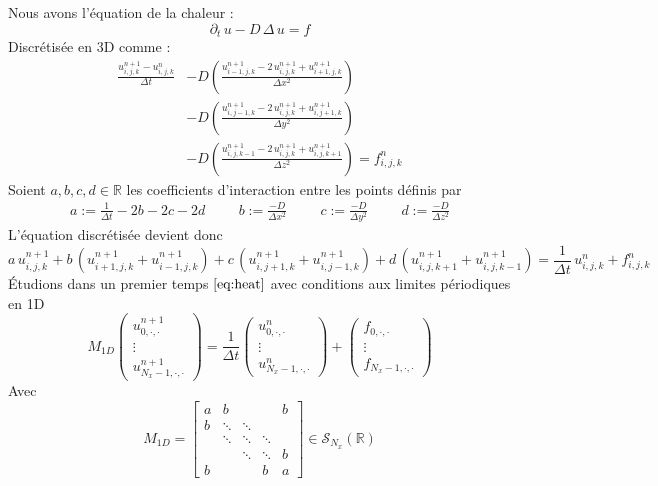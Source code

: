 \documentclass[11pt,a4paper]{article}
\begin{document}
Nous avons l'équation de la chaleur :
\begin{equation}
\partial_t\,u - D\,\Delta\,u = f\label{eq:heat}
\end{equation}
Discrétisée en 3D comme :
\begin{align*}
\frac{u^{n+1}_{i,j,k} - u^n_{i,j,k}}{\Delta t} &- D \left(\frac{u^{n+1}_{i-1,j,k} - 2\,u^{n+1}_{i,j,k}+u^{n+1}_{i+1,j,k}}{\Delta x^2} \right)\\
&-D \left(\frac{u^{n+1}_{i,j-1,k} - 2\,u^{n+1}_{i,j,k}+u^{n+1}_{i,j+1,k}}{\Delta y^2}\right)\\
&-D \left(\frac{u^{n+1}_{i,j,k-1} - 2\,u^{n+1}_{i,j,k}+u^{n+1}_{i,j,k+1}}{\Delta z^2}\right)= f_{i,j,k}^{n}
\end{align*}
Soient $a, b, c, d\in\mathbb{R}$ les coefficients d'interaction entre les points définis par
\begin{align*}
a := \frac{1}{\Delta t} -2b-2c-2d\hspace{1cm}b :=\frac{-D}{\Delta x^2}\hspace{1cm}c :=\frac{-D}{\Delta y^2}\hspace{1cm}d :=\frac{-D}{\Delta z^2}
\end{align*}
L'équation discrétisée devient donc
\begin{equation*}
a\,u_{i,j,k}^{n+1} + b\,\left(u_{i+1, j, k}^{n+1}+u_{i-1, j, k}^{n+1}\right) + c\,\left(u_{i, j+1, k}^{n+1}+u_{i, j-1, k}^{n+1}\right) + d\,\left(u_{i, j, k+1}^{n+1}+u_{i, j, k-1}^{n+1}\right) = \frac{1}{\Delta t}\,u_{i, j, k}^{n} + f_{i, j, k}^{n}
\end{equation*}
Étudions dans un premier temps $\eqref{eq:heat}$ avec conditions aux limites périodiques en 1D
\begin{equation*}
M_{1D}\left(\begin{array}{c}
u_{0, \cdot, \cdot}^{n+1}\\
\vdots\\
u_{N_x-1, \cdot, \cdot}^{n+1}
\end{array}\right) = \frac{1}{\Delta t} \left(\begin{array}{c}
u_{0, \cdot, \cdot}^{n}\\
\vdots\\
u_{N_x-1, \cdot, \cdot}^{n}
\end{array}\right) + \left(\begin{array}{c}
f_{0, \cdot, \cdot}\\
\vdots\\
f_{N_x-1, \cdot, \cdot}
\end{array}\right)
\end{equation*}
Avec
\begin{equation*}
M_{1D} = 
\begin{bmatrix}
a &b & & &b \\
b &\ddots &\ddots & & \\
 &\ddots &\ddots &\ddots &  \\
& &\ddots &\ddots  &b\\
b & & &b &a
\end{bmatrix}\in\mathcal{S}_{N_x}\left(\mathbb{R}\right)
\end{equation*}
\end{document}
